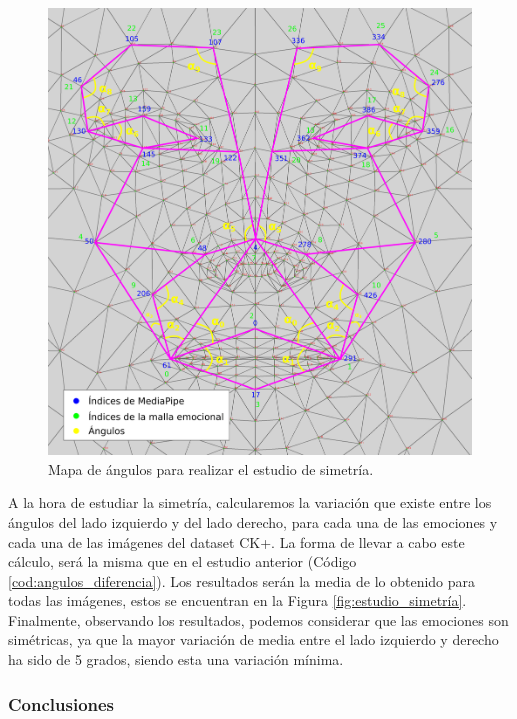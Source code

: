 \begin{figure} [h!]
  \begin{center}
    \includegraphics[width=13cm]{figs/emotional_mesh_2_mitades.png}
  \end{center}
  \captionsetup{justification=centering}
  \caption{Mapa de ángulos para realizar el estudio de simetría.}
  \label{fig:emotional_mesh_2_mitades}
\end{figure}

A la hora de estudiar la simetría, calcularemos la variación que existe entre los ángulos del lado izquierdo y del lado derecho, para cada una de las emociones y cada una de las imágenes del dataset CK+. La forma de llevar a cabo este cálculo, será la misma que en el estudio anterior (Código \ref{cod:angulos_diferencia}). Los resultados serán la media de lo obtenido para todas las imágenes, estos se encuentran en la Figura \ref{fig:estudio_simetría}.\\

Finalmente, observando los resultados, podemos considerar que las emociones son simétricas, ya que la mayor variación de media entre el lado izquierdo y derecho ha sido de 5 grados, siendo esta una variación mínima.

\subsubsection{Conclusiones}

